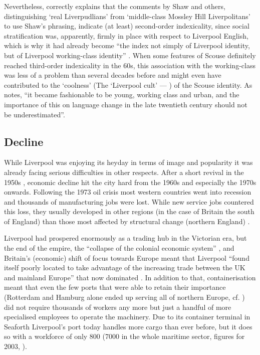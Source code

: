 Nevertheless, \citeauthor{crowley2012} correctly explains that the comments by Shaw and others, distinguishing `real Liverpudlians' from `middle-class Mossley Hill Liverpolitans' to use Shaw's phrasing, indicate (at least) second-order indexicality, since social stratification was, apparently, firmly in place with respect to Liverpool English, which is why it had already become ``the index not simply of Liverpool identity, but of Liverpool working-class identity'' \citep[107]{crowley2012}.
When some features of Scouse definitely reached third-order indexicality in the 60s, this association with the working-class was less of a problem than several decades before and might even have contributed to the `coolness' (The `Liverpool cult' --- \citealt[109]{crowley2012}) of the Scouse identity.
As \citet[165]{wales2006} notes, ``it became fashionable to be young, working class and urban, and the importance of this on language change in the late twentieth century should not be underestimated''.

		\subsection{Decline}\label{sec.hist.20.decline}

While Liverpool was enjoying its heyday in terms of image and popularity it was already facing serious difficulties in other respects. After a short revival in the 1950s \citep[cf.][402]{murden2006}, economic decline hit the city hard from the 1960s and especially the 1970s onwards.
Following the 1973 oil crisis most western countries went into recession and thousands of manufacturing jobs were lost.
While new service jobs countered this loss, they usually developed in other regions (in the case of Britain the south of England) than those most affected by structural change (northern England) \citep[cf.][16--17]{juddparkinson1990a}.

Liverpool had prospered enormously as a trading hub in the Victorian era, but the end of the empire, the ``collapse of the colonial economic system'' \citep[52]{belchem2006a}, and Britain's (economic) shift of focus towards Europe meant that Liverpool ``found itself poorly located to take advantage of the increasing trade between the UK and mainland Europe'' that now dominated \citep[166--167]{couch2003a}.
In addition to that, containerisation meant that even the few ports that were able to retain their importance (Rotterdam and Hamburg alone ended up serving all of northern Europe, cf. \citealt[264]{milne2006}) did not require thousands of workers any more but just a handful of more specialised employees to operate the machinery.
Due to its container terminal in Seaforth Liverpool's port today handles more cargo than ever before, but it does so with a workforce of only 800 (7000 in the whole maritime sector, figures for 2003, \citealt[cf.][477]{murden2006}).

